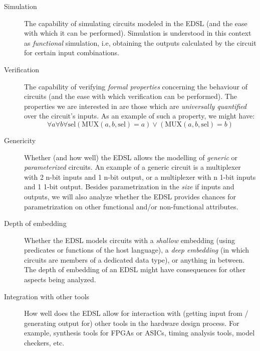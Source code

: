 \documentclass[a4paper]{article}
\begin{document}
            \begin{description}
                \item[Simulation]
                    The capability of simulating circuits modeled in the EDSL (and the ease with
                    which it can be performed). Simulation is understood in this context as
                    \emph{functional} simulation, i.e, obtaining the outputs calculated by the
                    circuit for certain input combinations.

                \item[Verification]
                    The capability of verifying \emph{formal properties} concerning the behaviour of
                    circuits (and the ease with which verification can be performed). The properties
                    we are interested in are those which are \emph{universally quantified} over the
                    circuit's inputs. As an example of such a property, we might have:
                    \[
                        \forall a \forall b \forall \text{sel}
                            \left( \text{MUX}(a,b,\text{sel}) = a \right)
                            \vee
                            \left( \text{MUX}(a,b,\text{sel}) = b \right)
                    \]

                \item[Genericity]
                    Whether (and how well) the EDSL allows the modelling of \emph{generic} or
                    \emph{parameterized} circuits. An example of a generic circuit is a multiplexer
                    with 2 n-bit inputs and 1 n-bit output, or a multiplexer with n 1-bit inputs and
                    1 1-bit output. Besides parametrization in the \emph{size} if inputs and
                    outputs, we will also analyze whether the EDSL provides chances for
                    parametrization on other functional and/or non-functional attributes.

                \item[Depth of embedding]
                    Whether the EDSL models circuits with a \emph{shallow} embedding (using
                    predicates or functions of the host language), a \emph{deep embedding}
                    (in which circuits are members of a dedicated data type), or anything in
                    between. The depth of embedding of an EDSL might have consequences for other
                    aspects being analyzed.

                \item[Integration with other tools]
                    How well does the EDSL allow for interaction with (getting input from / generating
                    output for) other tools in the hardware design process. For example, synthesis
                    tools for FPGAs or ASICs, timing analysis tools, model checkers, etc.


\end{description}
\end{document}
